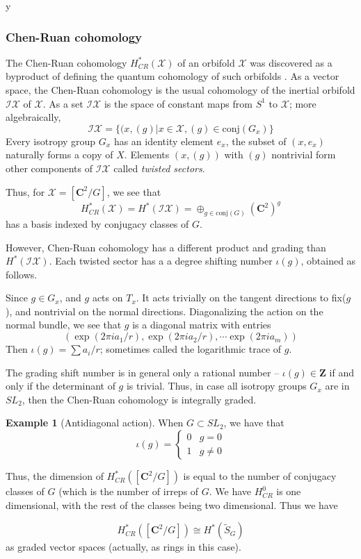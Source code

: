 y\documentclass{amsart}[12pt]
\theoremstyle{definition}
\newtheorem{example}[dummy]{Example}
\newcommand{\Z}{\mathbf{Z}}
\newcommand{\C}{\mathbf{C}}
\begin{document}
\subsubsection{Chen-Ruan cohomology}

The Chen-Ruan cohomology $H_{CR}^*(\mathcal{X})$ of an orbifold $\mathcal{X}$ was discovered as a byproduct of defining the quantum cohomology of such orbifolds \cite{chenruancohomology}.  As a vector space, the Chen-Ruan cohomology is the usual cohomology of the inertial orbifold $\mathcal{IX}$ of $\mathcal{X}$.  As a set $\mathcal{IX}$ is the space of constant maps from $S^1$ to $\mathcal{X}$; more algebraically, 
$$\mathcal{IX}=\{(x, (g)| x\in \mathcal{X}, (g)\in\textrm{conj}(G_x)\}$$
Every isotropy group $G_x$ has an identity element $e_x$, the subset of $(x, e_x)$ naturally forms a copy of $X$.  Elements $(x,(g))$ with $(g)$ nontrivial form other components of $\mathcal{IX}$ called \emph{twisted sectors}.

Thus, for $\mathcal{X}=[\C^2/G]$, we see that 
$$H_{CR}^*(\mathcal{X}) =H^*(\mathcal{IX})=\oplus_{g\in\textrm{conj}(G)} (\C^2)^g$$
has a basis indexed by conjugacy classes of $G$.

However, Chen-Ruan cohomology has a different product and grading than $H^*(\mathcal{IX})$.  Each twisted sector has a a degree shifting number $\iota(g)$, obtained as follows.

Since $g\in G_x$, and $g$ acts on $T_x$.  It acts trivially on the tangent directions to fix($g$), and nontrivial on the normal directions.  Diagonalizing the action on the normal bundle, we see that $g$ is a diagonal matrix with entries 
$$(\exp(2\pi i a_1/r), \exp(2\pi i a_2/r), \cdots \exp(2\pi i a_m))$$
Then $\iota(g)=\sum a_i/r$; sometimes called the logarithmic trace of $g$.

The grading shift number is in general only a rational number -- $\iota(g)\in \Z$ if and only if the determinant of $g$ is trivial.  Thus, in case all isotropy groups $G_x$ are in $SL_2$, then the Chen-Ruan cohomology is integrally graded.

\begin{example}[Antidiagonal action]
When $G\subset SL_2$, we have that 
$$\iota(g)=\left\{\begin{array}{rl} 0 & g=0 \\
1 & g\neq 0 \end{array}\right.
$$

Thus, the dimension of $H_{CR}^*([\C^2/G])$ is equal to the number of conjugacy classes of $G$ (which is the number of irreps of $G$.  We have $H_{CR}^0$ is one dimensional, with the rest of the classes being two dimensional.  Thus we have

$$H_{CR}^*([\C^2/G])\cong H^*(\widetilde{S}_G)$$
as graded vector spaces (actually, as rings in this case).  
\end{example}
\end{document}
